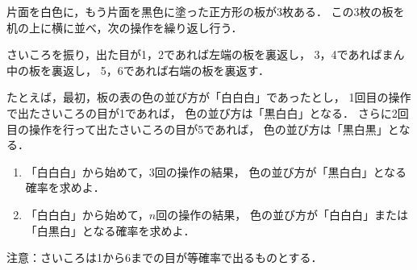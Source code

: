 \documentclass[../../main.tex]{subfiles}
\begin{document}
片面を白色に，もう片面を黒色に塗った正方形の板が3枚ある．
この3枚の板を机の上に横に並べ，次の操作を繰り返し行う．

さいころを振り，出た目が1，2であれば左端の板を裏返し，
3，4であればまん中の板を裏返し，
5，6であれば右端の板を裏返す．

たとえば，最初，板の表の色の並び方が「白白白」であったとし，
1回目の操作で出たさいころの目が1であれば，
色の並び方は「黒白白」となる．
さらに2回目の操作を行って出たさいころの目が5であれば，
色の並び方は「黒白黒」となる．
\begin{enumerate}
  \item 「白白白」から始めて，3回の操作の結果，
    色の並び方が「黒白白」となる確率を求めよ．
  \item 「白白白」から始めて，$n$回の操作の結果，
    色の並び方が「白白白」または「白黒白」となる確率を求めよ．
\end{enumerate}
注意：さいころは1から6までの目が等確率で出るものとする．
\end{document}

